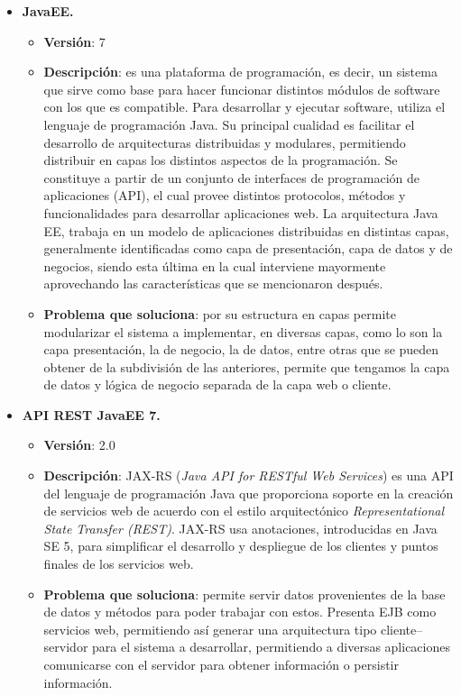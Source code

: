 \documentclass{memoria}
\begin{document}
\begin{itemize}
\item \textbf{JavaEE.}
	\begin{itemize}
	\item \textbf{Versión}: 7
	\item \textbf{Descripción}: es una plataforma de programación, es decir, un sistema que sirve como base para hacer funcionar distintos módulos de software con los que es compatible. Para desarrollar y ejecutar software, utiliza el lenguaje de programación Java. Su principal cualidad es facilitar el desarrollo de arquitecturas distribuidas y modulares, permitiendo distribuir en capas los distintos aspectos de la programación. Se constituye a partir de un conjunto de interfaces de programación de aplicaciones (API), el cual provee distintos protocolos, métodos y funcionalidades para desarrollar aplicaciones web.  La arquitectura Java EE, trabaja en un modelo de aplicaciones distribuidas en distintas capas, generalmente identificadas como capa de presentación, capa de datos y de negocios, siendo esta última en la cual interviene mayormente aprovechando las características que se mencionaron después.
	\item \textbf{Problema que soluciona}: por su estructura en capas permite modularizar el sistema a implementar, en diversas capas, como lo son la capa presentación, la de negocio, la de datos, entre otras que se pueden obtener de la subdivisión de las anteriores, permite que tengamos la capa de datos y lógica de negocio separada de la capa web o cliente.
	\end{itemize}

\item \textbf{API REST JavaEE 7.}
	\begin{itemize}
	\item \textbf{Versión}: 2.0
	\item \textbf{Descripción}: JAX-RS (\textsl{Java API for RESTful Web Services}) es una API del lenguaje de programación Java que proporciona soporte en la creación de servicios web de acuerdo con el estilo arquitectónico \textsl{Representational State Transfer (REST)}. JAX-RS usa anotaciones, introducidas en Java SE 5, para simplificar el desarrollo y despliegue de los clientes y puntos finales de los servicios web.
	\item \textbf{Problema que soluciona}: permite servir datos provenientes de la base de datos y métodos para poder trabajar con estos. Presenta EJB como servicios web, permitiendo así generar una arquitectura tipo cliente–servidor para el sistema a desarrollar, permitiendo a diversas aplicaciones comunicarse con el servidor para obtener información o persistir información.
	\end{itemize}
	

\end{itemize}
\end{document}
